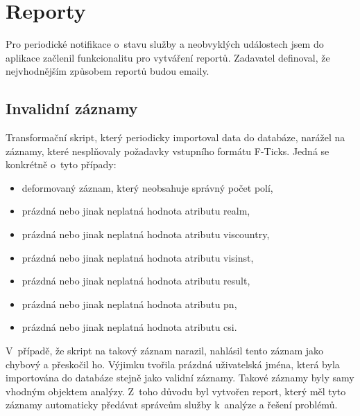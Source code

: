\documentclass[thesis=M,czech]{FITthesis}[2012/06/26]
\begin{document}
   
  \section{Reporty}
      
    Pro periodické notifikace o~stavu služby a neobvyklých událostech jsem 
    do aplikace začlenil funkcionalitu pro vytváření reportů.
    Zadavatel definoval, že nejvhodnějším způsobem reportů
    budou emaily.

    \subsection{Invalidní záznamy}

      Transformační skript, který periodicky importoval data do databáze, 
      narážel na záznamy, které nesplňovaly požadavky vstupního formátu F-Ticks.
      Jedná se konkrétně o~tyto případy:
      
      \begin{itemize}
        \item{deformovaný záznam, který neobsahuje správný počet polí,}
        \item{prázdná nebo jinak neplatná hodnota atributu realm,}
        \item{prázdná nebo jinak neplatná hodnota atributu viscountry,}
        \item{prázdná nebo jinak neplatná hodnota atributu visinst,}
        \item{prázdná nebo jinak neplatná hodnota atributu result,}
        \item{prázdná nebo jinak neplatná hodnota atributu pn,}
        \item{prázdná nebo jinak neplatná hodnota atributu csi.}
      \end{itemize}

      V~případě, že skript na takový záznam narazil, nahlásil tento záznam jako chybový a přeskočil ho.
      Výjimku tvořila prázdná uživatelská jména, která byla importována do databáze stejně jako validní záznamy.
      Takové záznamy byly samy vhodným objektem analýzy.
      Z~toho důvodu byl vytvořen report, 
      který měl tyto záznamy automaticky předávat správcům služby k~analýze a řešení problémů.
\end{document}
